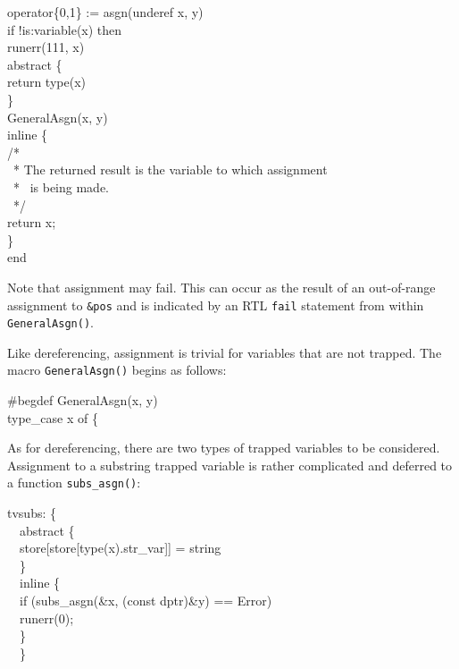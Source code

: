 \begin{iconcode}
operator\{0,1\} := asgn(underef x, y)\\
\>if !is:variable(x) then\\
\>\>runerr(111, x)\\
\>abstract \{\\
\>\>return type(x)\\
\>\>\}\\
\>GeneralAsgn(x, y)\\
\>inline \{\\
\>\>/*\\
\>\>\ * The returned result is the variable to which assignment \\
\>\>\ * \ is being made.\\
\>\>\ */\\
\>\>return x;\\
\>\>\}\\
end
\end{iconcode}

Note that assignment may fail. This can occur as the result of an
out-of-range assignment to \texttt{\&pos} and is indicated by an RTL
\texttt{fail} statement from within \texttt{GeneralAsgn()}.

Like dereferencing, assignment is trivial for variables that are not
trapped. The macro \texttt{GeneralAsgn()} begins as follows:

\begin{iconcode}
\#begdef GeneralAsgn(x, y)\\
\>type\_case x of \{
\end{iconcode}

As for dereferencing, there are two types of trapped variables to be
considered. Assignment to a substring trapped variable is rather
complicated and deferred to a function \texttt{subs\_asgn()}:

\begin{iconcode}
\>\>tvsubs: \{\\
\>\>\ \ abstract \{\\
\>\>\>\ \ store[store[type(x).str\_var]] = string\\
\>\>\>\ \ \}\\
\>\>\ \ inline \{\\
\>\>\>\ \ if (subs\_asgn(\&x, (const dptr)\&y) == Error)\\
\>\>\>\>\ \ runerr(0);\\
\>\>\>\ \ \}\\
\>\>\ \ \}
\end{iconcode}

